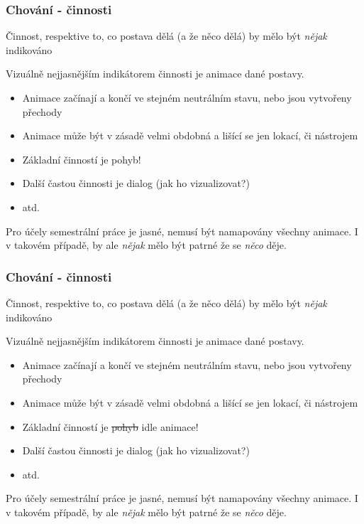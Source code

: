 ﻿\documentclass[a4paper]{beamer}
\begin{document}
\begin{frame}
\frametitle{Chování - činnosti}

Činnost, respektive to, co postava dělá (a že něco dělá) by mělo být \emph{nějak} indikováno
 \vfill
 
 Vizuálně nejjasnějším indikátorem činnosti je animace dané postavy.
 
 \vfill

  \begin{itemize} 
      \item Animace začínají a končí ve stejném neutrálním stavu, nebo jsou vytvořeny přechody
      \item Animace může být v zásadě velmi obdobná a lišící se jen lokací, či nástrojem
      \item Základní činností je pohyb!
      \item Další častou činnosti je dialog (jak ho vizualizovat?)
      \item atd.
  \end{itemize}
  
  \vfill
  
\small Pro účely semestrální práce je jasné, nemusí být namapovány všechny animace. 
 I v takovém případě, by ale \emph{nějak} mělo být patrné že se \emph{něco} děje. 
  
\end{frame}

\begin{frame}
\frametitle{Chování - činnosti}

Činnost, respektive to, co postava dělá (a že něco dělá) by mělo být \emph{nějak} indikováno
 \vfill
 
 Vizuálně nejjasnějším indikátorem činnosti je animace dané postavy.
 
 \vfill

  \begin{itemize} 
      \item Animace začínají a končí ve stejném neutrálním stavu, nebo jsou vytvořeny přechody
      \item Animace může být v zásadě velmi obdobná a lišící se jen lokací, či nástrojem
      \item Základní činností je \sout{pohyb} idle animace!
      \item Další častou činnosti je dialog (jak ho vizualizovat?)
      \item atd.
  \end{itemize}
  
  \vfill
  
\small Pro účely semestrální práce je jasné, nemusí být namapovány všechny animace. 
 I v takovém případě, by ale \emph{nějak} mělo být patrné že se \emph{něco} děje. 
  
\end{frame}
\end{document}
